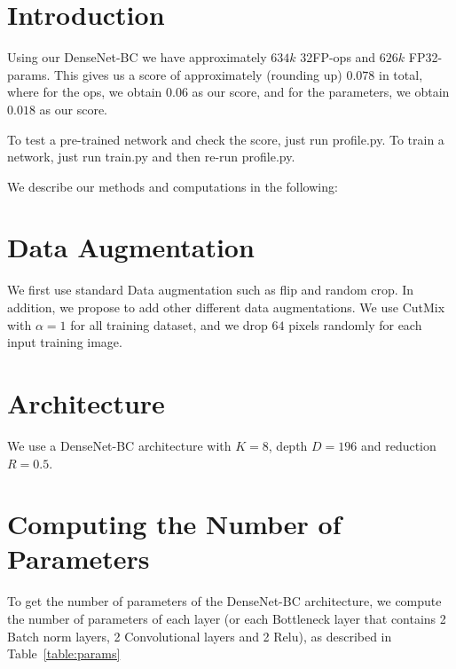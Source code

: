 \documentclass{article}
\title{}
\author{}
\date{}
\begin{document}
\maketitle

\section{Introduction}

Using our DenseNet-BC we have approximately $634k$ 32FP-ops and $626k$ FP32-params. This gives us a score of approximately (rounding up) $0.078$ in total, where for the ops, we obtain $0.06$ as our score, and for the parameters, we obtain $0.018$ as our score.

To test a pre-trained network and check the score, just run profile.py. To train a network, just run train.py and then re-run profile.py.  

We describe our methods and computations in the following:

\section{Data Augmentation}
\label{data_aug}

We first use standard Data augmentation such as flip and random crop. In addition, we propose to add other different data augmentations. We use CutMix with $\alpha = 1$ for all training dataset, and we drop $64$ pixels randomly for each input training image. 

\section{Architecture}

We use a DenseNet-BC architecture with $K = 8$, depth $D = 196$ and reduction $R = 0.5$. 

\section{Computing the Number of Parameters}

To get the number of parameters of the DenseNet-BC architecture, we compute the number of parameters of each layer (or each Bottleneck layer that contains 2 Batch norm layers, 2 Convolutional layers and 2 Relu), as described in Table~\ref{table:params}
\end{document}
